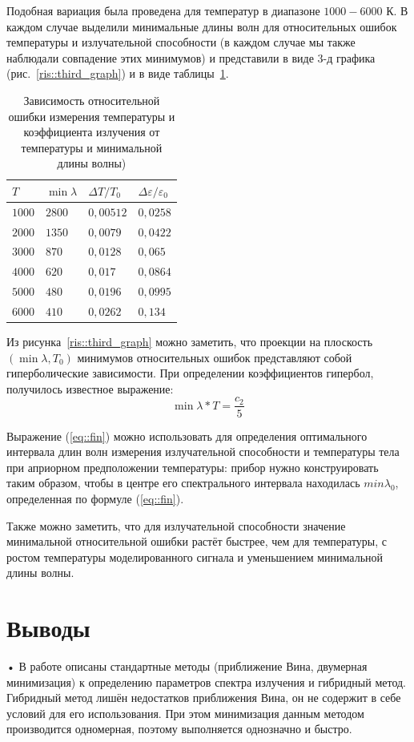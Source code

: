 Подобная вариация была проведена для температур в диапазоне $1000-6000$ К. В каждом случае выделили минимальные длины волн для относительных ошибок температуры и излучательной способности (в каждом случае мы также наблюдали совпадение этих минимумов) и представили в виде 3-д графика (рис.~\ref{ris::third_graph}) и в виде таблицы~\ref{table:table}.
\begin{table}[H]
	\centering
	\caption{Зависимость относительной ошибки измерения температуры и коэффициента излучения от температуры и минимальной длины волны)}
	\label{table:table}
	\begin{tabular}{|l|l|l|l|}
		\hline 
            $T$ & $\min \lambda$ & $\Delta T/T_0$ & $\Delta \varepsilon/\varepsilon_0$  \\ \hline 
		$1000$ & $2800$ & $0,00512$ & $0,0258$  \\ \hline  
		$2000$ & $1350$ & $0,0079$ & $0,0422$ \\ \hline
		$3000$ & $870$ & $0,0128$ & $0,065$  \\ \hline 
		$4000$ & $620$ & $0,017$ & $0,0864$  \\ \hline 
		$5000$ & $480$ & $0,0196$ & $0,0995$  \\ \hline 
		$6000$ & $410$ & $0,0262$ & $0,134$ \\ \hline 
	\end{tabular}
\end{table}
Из рисунка~\ref{ris::third_graph} можно заметить, что проекции на плоскость $(\min \lambda, T_0)$ минимумов относительных ошибок представляют собой гиперболические зависимости. При определении коэффициентов гипербол, получилось известное выражение:
\begin{equation}
\label{eq::fin}
    \min \lambda * T = \dfrac{c_2}{5}
\end{equation}

Выражение (\ref{eq::fin}) можно использовать для определения оптимального интервала длин волн измерения излучательной способности и температуры тела при априорном предположении температуры: прибор нужно конструировать таким образом, чтобы в центре его спектрального интервала находилась $min \lambda_0$, определенная по формуле (\ref{eq::fin}).

Также можно заметить, что для излучательной способности значение минимальной относительной ошибки растёт быстрее, чем для температуры, с ростом температуры моделированного сигнала и уменьшением минимальной длины волны.


\section{Выводы}
• В работе описаны стандартные методы (приближение Вина, двумерная минимизация) к определению параметров спектра излучения и гибридный метод. Гибридный метод лишён недостатков приближения Вина, он не содержит в себе условий для его использования. При этом минимизация данным методом производится одномерная, поэтому выполняется однозначно и быстро.

